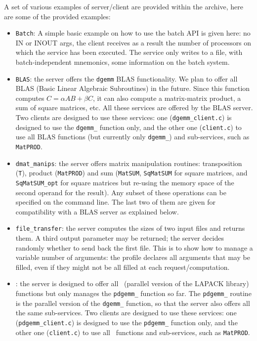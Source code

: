 A set of various examples of \diet server/client are provided within the \diet
archive, here are some of the provided examples:
\begin{itemize}
\item{\texttt{Batch}}: A simple basic example on how to use the batch API is
  given here: no IN or INOUT args, the client receives as a result the number
  of processors on which the service has been executed. The service only writes
  to a file, with batch-independent mnemonics, some information on the batch
  system.

\item{\texttt{BLAS}}: the server offers the \texttt{dgemm} BLAS
  functionality. We plan to offer all BLAS (Basic Linear Algebraic Subroutines)
  in the future. Since this function computes $C = \alpha AB + \beta C$, it can
  also compute a matrix-matrix product, a sum of square matrices, etc. All
  these services are offered by the BLAS server. Two clients are designed to
  use these services: one (\texttt{dgemm\_client.c}) is designed to use the
  \texttt{dgemm\_} function only, and the other one (\texttt{client.c}) to use
  all BLAS functions (but currently only \texttt{dgemm\_}) and sub-services,
  such as \texttt{MatPROD}.

\item{\texttt{dmat\_manips}}: the server offers matrix manipulation routines:
  transposition (\texttt{T}), product (\texttt{MatPROD}) and sum
  (\texttt{MatSUM}, \texttt{SqMatSUM} for square matrices, and
  \texttt{SqMatSUM\_opt} for square matrices but re-using the memory space of
  the second operand for the result). Any subset of these operations can be
  specified on the command line. The last two of them are given for
  compatibility with a BLAS server as explained below.

\item{\texttt{file\_transfer}}: the server computes the sizes of two input
  files and returns them. A third output parameter may be returned; the server
  decides randomly whether to send back the first file. This is to show how to
  manage a variable number of arguments: the profile declares all arguments
  that may be filled, even if they might not be all filled at each
  request/computation.

\item{\texttt{\scalapack}}: the server is designed to offer all
  \scalapack\  (parallel version of the LAPACK library) functions but only
  manages the \texttt{pdgemm\_} function so far. The \texttt{pdgemm\_} routine
  is the parallel version of the \texttt{dgemm\_} function, so that the server
  also offers all the same sub-services. Two clients are designed to use these
  services: one (\texttt{pdgemm\_client.c}) is designed to use the
  \texttt{pdgemm\_} function only, and the other one (\texttt{client.c}) to use
  all \scalapack\ functions and sub-services, such as \texttt{MatPROD}.


\end{itemize}
